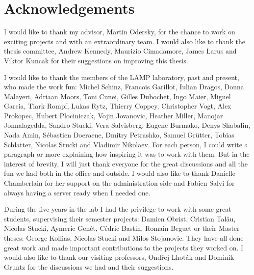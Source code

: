 \chapter*{Acknowledgements}

\vspace{0.5em}

I would like to thank my advisor, Martin Odersky, for the chance to work on exciting projects and with an extraordinary team. I would also like to thank the thesis committee, Andrew Kennedy, Maurizio Cimadamore, James Larus and Viktor Kuncak for their suggestions on improving this thesis.

\vspace{0.5em}

I would like to thank the members of the LAMP laboratory, past and present, who made the work fun: Michel Schinz, Francois Garillot, Iulian Dragos, Donna Malayeri, Adriaan Moors, Toni Cunei, Gilles Dubochet, Ingo Maier, Miguel Garcia, Tiark Rompf, Lukas Rytz, Thierry Coppey, Christopher Vogt, Alex Prokopec, Hubert Plociniczak, Vojin Jovanovic, Heather Miller, Manojar Jonnalagedda, Sandro Stucki, Vera Salvisberg, Eugene Burmako, Denys Shabalin, Nada Amin, Sébastien Doeraene, Dmitry Petrashko, Samuel Grütter, Tobias Schlatter, Nicolas Stucki and Vladimir Nikolaev. For each person, I could write a paragraph or more explaining how inspiring it was to work with them. But in the interest of brevity, I will just thank everyone for the great discussions and all the fun we had both in the office and outside. I would also like to thank Danielle Chamberlain for her support on the administration side and Fabien Salvi for always having a server ready when I needed one.

\vspace{0.5em}

During the five years in the lab I had the privilege to work with some great students, supervising their semester projects: Damien Obrist, Cristian Tal\u{a}u, Nicolas Stucki, Aymeric Genêt, Cédric Bastin, Romain Beguet or their Master theses: George Kollias, Nicolas Stucki and Milos Stojanovic. They have all done great work and made important contributions to the projects they worked on. I would also like to thank our visiting professors, Ond\v{r}ej Lhot\'{a}k and Dominik Gruntz for the discussions we had and their suggestions.

\vspace{0.5em}

